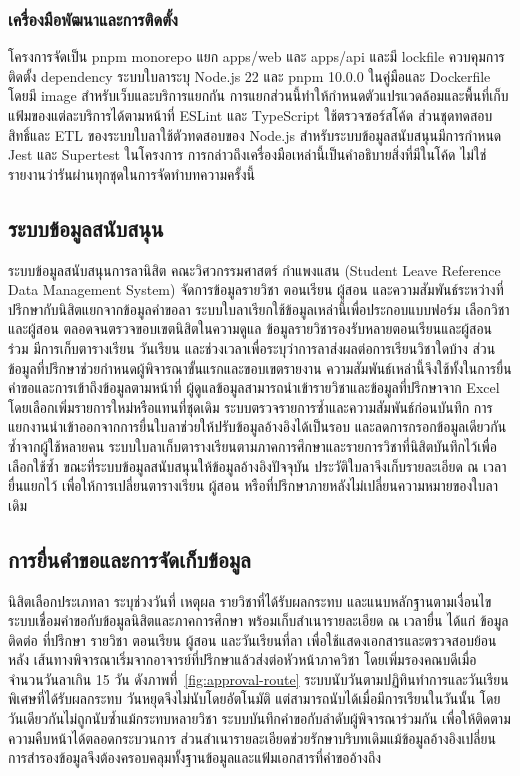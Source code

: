 \subsubsection{เครื่องมือพัฒนาและการติดตั้ง}
โครงการจัดเป็น pnpm monorepo แยก apps/web และ apps/api และมี lockfile
ควบคุมการติดตั้ง dependency ระบบใบลาระบุ Node.js 22 และ pnpm 10.0.0
ในคู่มือและ Dockerfile โดยมี image สำหรับเว็บและบริการแยกกัน
การแยกส่วนนี้ทำให้กำหนดตัวแปรแวดล้อมและพื้นที่เก็บแฟ้มของแต่ละบริการได้ตามหน้าที่
ESLint และ TypeScript ใช้ตรวจซอร์สโค้ด ส่วนชุดทดสอบสิทธิ์และ ETL
ของระบบใบลาใช้ตัวทดสอบของ Node.js สำหรับระบบข้อมูลสนับสนุนมีการกำหนด
Jest และ Supertest ในโครงการ
การกล่าวถึงเครื่องมือเหล่านี้เป็นคำอธิบายสิ่งที่มีในโค้ด
ไม่ใช่รายงานว่ารันผ่านทุกชุดในการจัดทำบทความครั้งนี้
\subsection{ระบบข้อมูลสนับสนุน}
ระบบข้อมูลสนับสนุนการลานิสิต คณะวิศวกรรมศาสตร์ กำแพงแสน (Student
Leave Reference Data Management System) จัดการข้อมูลรายวิชา ตอนเรียน
ผู้สอน และความสัมพันธ์ระหว่างที่ปรึกษากับนิสิตแยกจากข้อมูลคำขอลา
ระบบใบลาเรียกใช้ข้อมูลเหล่านี้เพื่อประกอบแบบฟอร์ม เลือกวิชาและผู้สอน
ตลอดจนตรวจขอบเขตนิสิตในความดูแล \cite{components}
ข้อมูลรายวิชารองรับหลายตอนเรียนและผู้สอนร่วม มีการเก็บตารางเรียน
วันเรียน และช่วงเวลาเพื่อระบุว่าการลาส่งผลต่อการเรียนวิชาใดบ้าง
ส่วนข้อมูลที่ปรึกษาช่วยกำหนดผู้พิจารณาขั้นแรกและขอบเขตรายงาน
ความสัมพันธ์เหล่านี้จึงใช้ทั้งในการยื่นคำขอและการเข้าถึงข้อมูลตามหน้าที่
ผู้ดูแลข้อมูลสามารถนำเข้ารายวิชาและข้อมูลที่ปรึกษาจาก Excel
โดยเลือกเพิ่มรายการใหม่หรือแทนที่ชุดเดิม
ระบบตรวจรายการซ้ำและความสัมพันธ์ก่อนบันทึก
การแยกงานนำเข้าออกจากการยื่นใบลาช่วยให้ปรับข้อมูลอ้างอิงได้เป็นรอบ
และลดการกรอกข้อมูลเดียวกันซ้ำจากผู้ใช้หลายคน
ระบบใบลาเก็บตารางเรียนตามภาคการศึกษาและรายการวิชาที่นิสิตบันทึกไว้เพื่อเลือกใช้ซ้ำ
ขณะที่ระบบข้อมูลสนับสนุนให้ข้อมูลอ้างอิงปัจจุบัน
ประวัติใบลาจึงเก็บรายละเอียด ณ เวลายื่นแยกไว้
เพื่อให้การเปลี่ยนตารางเรียน ผู้สอน
หรือที่ปรึกษาภายหลังไม่เปลี่ยนความหมายของใบลาเดิม
\subsection{การยื่นคำขอและการจัดเก็บข้อมูล}
นิสิตเลือกประเภทลา ระบุช่วงวันที่ เหตุผล รายวิชาที่ได้รับผลกระทบ
และแนบหลักฐานตามเงื่อนไข ระบบเชื่อมคำขอกับข้อมูลนิสิตและภาคการศึกษา
พร้อมเก็บสำเนารายละเอียด ณ เวลายื่น ได้แก่ ข้อมูลติดต่อ ที่ปรึกษา
รายวิชา ตอนเรียน ผู้สอน และวันเรียนที่ลา
เพื่อใช้แสดงเอกสารและตรวจสอบย้อนหลัง \cite{schema}
เส้นทางพิจารณาเริ่มจากอาจารย์ที่ปรึกษาแล้วส่งต่อหัวหน้าภาควิชา
โดยเพิ่มรองคณบดีเมื่อจำนวนวันลาเกิน 15 วัน
ดังภาพที่~\ref{fig:approval-route}
ระบบนับวันตามปฏิทินทำการและวันเรียนพิเศษที่ได้รับผลกระทบ
วันหยุดจึงไม่นับโดยอัตโนมัติ แต่สามารถนับได้เมื่อมีการเรียนในวันนั้น
โดยวันเดียวกันไม่ถูกนับซ้ำแม้กระทบหลายวิชา
ระบบบันทึกคำขอกับลำดับผู้พิจารณาร่วมกัน
เพื่อให้ติดตามความคืบหน้าได้ตลอดกระบวนการ
ส่วนสำเนารายละเอียดช่วยรักษาบริบทเดิมแม้ข้อมูลอ้างอิงเปลี่ยน
การสำรองข้อมูลจึงต้องครอบคลุมทั้งฐานข้อมูลและแฟ้มเอกสารที่คำขออ้างถึง
